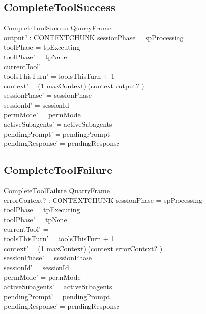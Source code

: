 \documentclass[a4paper,10pt,fleqn]{article}
\begin{document}
\subsection{CompleteToolSuccess}

\begin{schema}{CompleteToolSuccess}
  QuarryFrame \\
  output? : CONTEXTCHUNK
  \where
  sessionPhase = spProcessing \\
  toolPhase = tpExecuting \\
  toolPhase' = tpNone \\
  currentTool' = \emptyset \\
  toolsThisTurn' = toolsThisTurn + 1 \\
  context' = (1 \upto maxContext) \dres (context \cat \langle output? \rangle) \\
  sessionPhase' = sessionPhase \\
  sessionId' = sessionId \\
  permMode' = permMode \\
  activeSubagents' = activeSubagents \\
  pendingPrompt' = pendingPrompt \\
  pendingResponse' = pendingResponse
\end{schema}

\subsection{CompleteToolFailure}

\begin{schema}{CompleteToolFailure}
  QuarryFrame \\
  errorContext? : CONTEXTCHUNK
  \where
  sessionPhase = spProcessing \\
  toolPhase = tpExecuting \\
  toolPhase' = tpNone \\
  currentTool' = \emptyset \\
  toolsThisTurn' = toolsThisTurn + 1 \\
  context' = (1 \upto maxContext) \dres (context \cat \langle errorContext? \rangle) \\
  sessionPhase' = sessionPhase \\
  sessionId' = sessionId \\
  permMode' = permMode \\
  activeSubagents' = activeSubagents \\
  pendingPrompt' = pendingPrompt \\
  pendingResponse' = pendingResponse
\end{schema}
\end{document}
